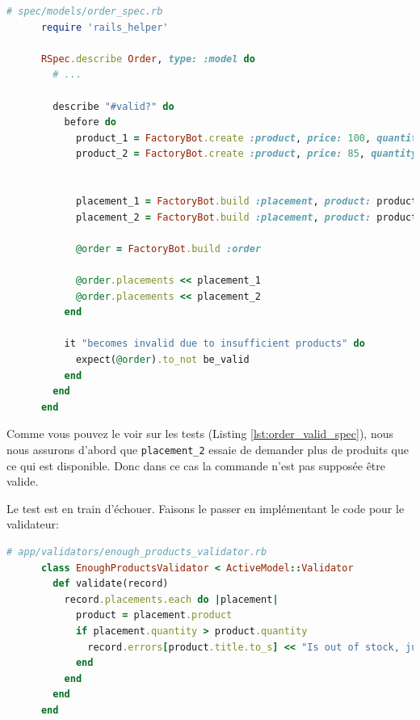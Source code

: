 \documentclass[]{report}
\begin{document}
    \begin{scriptsize}
      \begin{lstlisting}[language=ruby, caption={Test de la validation de la commande}, label={lst:order_valid_spec}]
      # spec/models/order_spec.rb
      require 'rails_helper'

      RSpec.describe Order, type: :model do
        # ...

        describe "#valid?" do
          before do
            product_1 = FactoryBot.create :product, price: 100, quantity: 5
            product_2 = FactoryBot.create :product, price: 85, quantity: 10


            placement_1 = FactoryBot.build :placement, product: product_1, quantity: 3
            placement_2 = FactoryBot.build :placement, product: product_2, quantity: 15

            @order = FactoryBot.build :order

            @order.placements << placement_1
            @order.placements << placement_2
          end

          it "becomes invalid due to insufficient products" do
            expect(@order).to_not be_valid
          end
        end
      end
      \end{lstlisting}
    \end{scriptsize}

    Comme vous pouvez le voir sur les tests (Listing \ref{lst:order_valid_spec}), nous nous assurons d'abord que \verb|placement_2| essaie de demander plus de produits que ce qui est disponible. Donc dans ce cas la commande n'est pas supposée être valide.

    Le test est en train d'échouer. Faisons le passer en implémentant le code pour le validateur:

    \begin{scriptsize}
      \begin{lstlisting}[language=ruby]
      # app/validators/enough_products_validator.rb
      class EnoughProductsValidator < ActiveModel::Validator
        def validate(record)
          record.placements.each do |placement|
            product = placement.product
            if placement.quantity > product.quantity
              record.errors[product.title.to_s] << "Is out of stock, just #{product.quantity} left"
            end
          end
        end
      end
      \end{lstlisting}
    \end{scriptsize}
\end{document}
